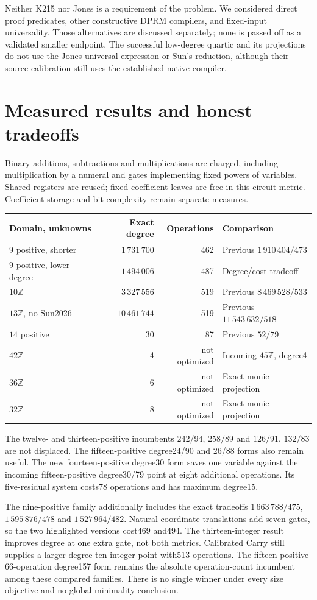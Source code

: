 \documentclass[11pt]{article}
\newcommand{\Z}{\mathbb Z}\newcommand{\N}{\mathbb N}
\begin{document}
Neither K215 nor Jones is a requirement of the problem. We considered direct
proof predicates, other constructive DPRM compilers, and fixed-input
universality. Those alternatives are discussed separately; none is passed
off as a validated smaller endpoint. The successful low-degree quartic and
its projections do not use the Jones universal expression or Sun's reduction,
although their source calibration still uses the established native compiler.

\section{Measured results and honest tradeoffs}
Binary additions, subtractions and multiplications are charged, including
multiplication by a numeral and gates implementing fixed powers of variables.
Shared registers are reused; fixed coefficient leaves are free in this circuit
metric. Coefficient storage and bit complexity remain separate measures.
\begin{center}\small
\begin{tabular}{@{}lrrl@{}}\toprule
Domain, unknowns & Exact degree & Operations & Comparison\\\midrule
$9$ positive, shorter & $1\,731\,700$ &462& Previous $1\,910\,404/473$\\
$9$ positive, lower degree & $1\,494\,006$ &487& Degree/cost tradeoff\\
$10\Z$ & $3\,327\,556$ &519& Previous $8\,469\,528/533$\\
$13\Z$, no Sun2026 & $10\,461\,744$ &519& Previous $11\,543\,632/518$\\
$14$ positive &30&87& Previous $52/79$\\
$42\Z$ &4& not optimized & Incoming $45\Z$, degree4\\
$36\Z$ &6& not optimized & Exact monic projection\\
$32\Z$ &8& not optimized & Exact monic projection\\\bottomrule
\end{tabular}
\end{center}
The twelve- and thirteen-positive incumbents $242/94$, $258/89$ and
$126/91$, $132/83$ are not displaced. The fifteen-positive degree24/90 and
26/88 forms also remain useful. The new fourteen-positive degree30 form
saves one variable against the incoming fifteen-positive degree30/79 point
at eight additional operations. Its five-residual system costs78 operations
and has maximum degree15.

The nine-positive family additionally includes the exact tradeoffs
$1\,663\,788/475$, $1\,595\,876/478$ and $1\,527\,964/482$.
Natural-coordinate translations add seven gates, so the two highlighted
versions cost469 and494. The thirteen-integer result improves degree at
one extra gate, not both metrics. Calibrated Carry still supplies a
larger-degree ten-integer point with513 operations. The fifteen-positive
66-operation degree157 form remains the absolute operation-count incumbent
among these compared families. There is no single winner under every size
objective and no global minimality conclusion.
\end{document}
